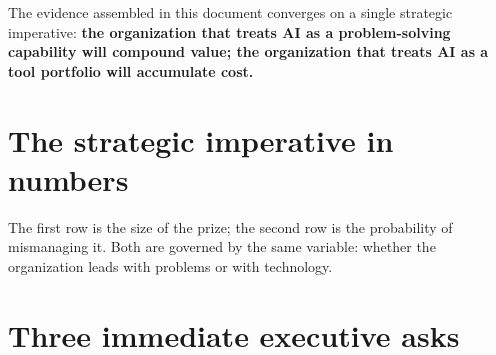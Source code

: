 
The evidence assembled in this document converges on a single strategic
imperative: \textbf{the organization that treats AI as a problem-solving
capability will compound value; the organization that treats AI as a tool
portfolio will accumulate cost.}

\section{The strategic imperative in numbers}

\begin{center}
  \qquad\qquad
  \qquad\qquad
\end{center}

\begin{center}
  \qquad\qquad
  \qquad\qquad
\end{center}

The first row is the size of the prize; the second row is the probability of
mismanaging it. Both are governed by the same variable: whether the
organization leads with problems or with technology.

\section{Three immediate executive asks}

